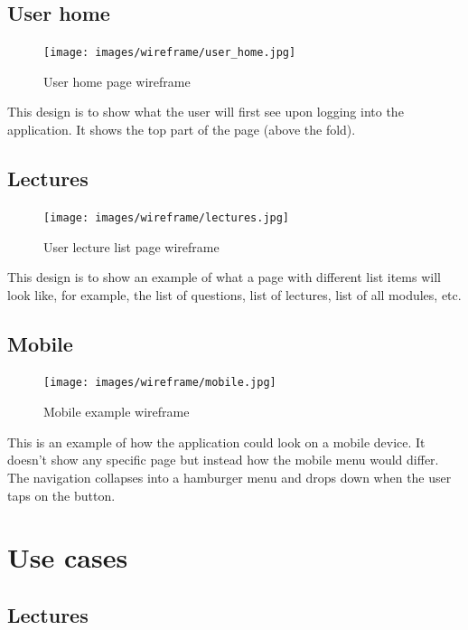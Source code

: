\subsection{User home}
\begin{figure}[H]
    \centering
    \texttt{[image: images/wireframe/user\_home.jpg]}
    \caption{User home page wireframe}
    \label{fig:my_label}
\end{figure}
This design is to show what the user will first see upon logging into the application. It shows the top part of the page (above the fold).

\subsection{Lectures}
\begin{figure}[H]
    \centering
    \texttt{[image: images/wireframe/lectures.jpg]}
    \caption{User lecture list page wireframe}
    \label{fig:my_label}
\end{figure}
This design is to show an example of what a page with different list items will look like, for example, the list of questions, list of lectures, list of all modules, etc. 

\subsection{Mobile}
\begin{figure}[H]
    \centering
    \texttt{[image: images/wireframe/mobile.jpg]}
    \caption{Mobile example wireframe}
    \label{fig:my_label}
\end{figure}

This is an example of how the application could look on a mobile device. It doesn't show any specific page but instead how the mobile menu would differ. The navigation collapses into a hamburger menu and drops down when the user taps on the button.

\section{Use cases}

\subsection{Lectures}

